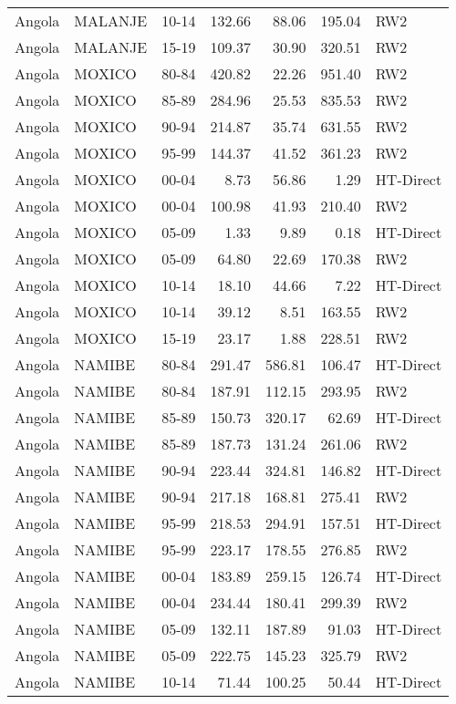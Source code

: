 \begin{longtable}{lllrrrl}
  Angola & MALANJE & 10-14 & 132.66 & 88.06 & 195.04 & RW2 \\ 
  Angola & MALANJE & 15-19 & 109.37 & 30.90 & 320.51 & RW2 \\ 
  Angola & MOXICO & 80-84 & 420.82 & 22.26 & 951.40 & RW2 \\ 
  Angola & MOXICO & 85-89 & 284.96 & 25.53 & 835.53 & RW2 \\ 
  Angola & MOXICO & 90-94 & 214.87 & 35.74 & 631.55 & RW2 \\ 
  Angola & MOXICO & 95-99 & 144.37 & 41.52 & 361.23 & RW2 \\ 
  Angola & MOXICO & 00-04 & 8.73 & 56.86 & 1.29 & HT-Direct \\ 
  Angola & MOXICO & 00-04 & 100.98 & 41.93 & 210.40 & RW2 \\ 
  Angola & MOXICO & 05-09 & 1.33 & 9.89 & 0.18 & HT-Direct \\ 
  Angola & MOXICO & 05-09 & 64.80 & 22.69 & 170.38 & RW2 \\ 
  Angola & MOXICO & 10-14 & 18.10 & 44.66 & 7.22 & HT-Direct \\ 
  Angola & MOXICO & 10-14 & 39.12 & 8.51 & 163.55 & RW2 \\ 
  Angola & MOXICO & 15-19 & 23.17 & 1.88 & 228.51 & RW2 \\ 
  Angola & NAMIBE & 80-84 & 291.47 & 586.81 & 106.47 & HT-Direct \\ 
  Angola & NAMIBE & 80-84 & 187.91 & 112.15 & 293.95 & RW2 \\ 
  Angola & NAMIBE & 85-89 & 150.73 & 320.17 & 62.69 & HT-Direct \\ 
  Angola & NAMIBE & 85-89 & 187.73 & 131.24 & 261.06 & RW2 \\ 
  Angola & NAMIBE & 90-94 & 223.44 & 324.81 & 146.82 & HT-Direct \\ 
  Angola & NAMIBE & 90-94 & 217.18 & 168.81 & 275.41 & RW2 \\ 
  Angola & NAMIBE & 95-99 & 218.53 & 294.91 & 157.51 & HT-Direct \\ 
  Angola & NAMIBE & 95-99 & 223.17 & 178.55 & 276.85 & RW2 \\ 
  Angola & NAMIBE & 00-04 & 183.89 & 259.15 & 126.74 & HT-Direct \\ 
  Angola & NAMIBE & 00-04 & 234.44 & 180.41 & 299.39 & RW2 \\ 
  Angola & NAMIBE & 05-09 & 132.11 & 187.89 & 91.03 & HT-Direct \\ 
  Angola & NAMIBE & 05-09 & 222.75 & 145.23 & 325.79 & RW2 \\ 
  Angola & NAMIBE & 10-14 & 71.44 & 100.25 & 50.44 & HT-Direct \\ 

\end{longtable}
